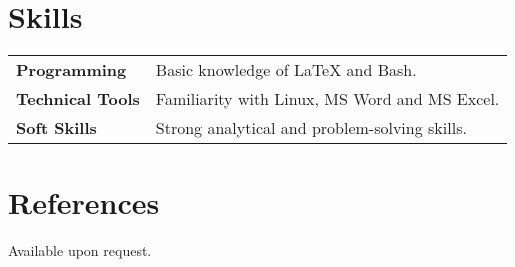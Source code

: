 \documentclass[a4paper, oneside, final]{scrartcl} %
\begin{document}
\begin{center}

\section{Skills}

\begin{tabularx}{0.97\linewidth}{>{\bfseries}l X}
Programming & Basic knowledge of LaTeX and Bash. \\
Technical Tools & Familiarity with Linux, MS Word and MS Excel. \\
Soft Skills & Strong analytical and problem-solving skills. \\
\end{tabularx}


\section{References}

Available upon request.

\end{center}
\end{document}
